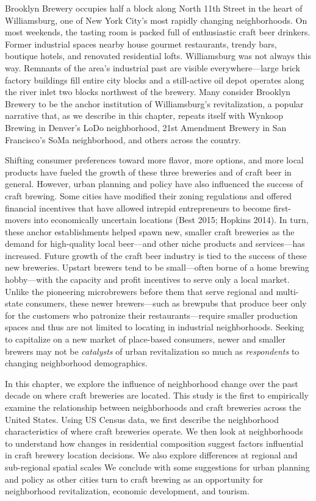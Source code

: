 \documentclass[]{article}
\begin{document}
Brooklyn Brewery occupies half a block along North 11th Street in the
heart of Williamsburg, one of New York City's most rapidly changing
neighborhoods. On most weekends, the tasting room is packed full of
enthusiastic craft beer drinkers. Former industrial spaces nearby house
gourmet restaurants, trendy bars, boutique hotels, and renovated
residential lofts. Williamsburg was not always this way. Remnants of the
area's industrial past are visible everywhere---large brick factory
buildings fill entire city blocks and a still-active oil depot operates
along the river inlet two blocks northwest of the brewery. Many consider
Brooklyn Brewery to be the anchor institution of Williamsburg's
revitalization, a popular narrative that, as we describe in this
chapter, repeats itself with Wynkoop Brewing in Denver's LoDo
neighborhood, 21st Amendment Brewery in San Francisco's SoMa
neighborhood, and others across the country.

Shifting consumer preferences toward more flavor, more options, and more
local products have fueled the growth of these three breweries and of
craft beer in general. However, urban planning and policy have also
influenced the success of craft brewing. Some cities have modified their
zoning regulations and offered financial incentives that have allowed
intrepid entrepreneurs to become first-movers into economically
uncertain locations (Best 2015; Hopkins 2014). In turn, these anchor
establishments helped spawn new, smaller craft breweries as the demand
for high-quality local beer---and other niche products and
services---has increased. Future growth of the craft beer industry is
tied to the success of these new breweries. Upstart brewers tend to be
small---often borne of a home brewing hobby---with the capacity and
profit incentives to serve only a local market. Unlike the pioneering
microbrewers before them that serve regional and multi-state consumers,
these newer brewers---such as brewpubs that produce beer only for the
customers who patronize their restaurants---require smaller production
spaces and thus are not limited to locating in industrial neighborhoods.
Seeking to capitalize on a new market of place-based consumers, newer
and smaller brewers may not be \emph{catalysts} of urban revitalization
so much as \emph{respondents} to changing neighborhood demographics.

In this chapter, we explore the influence of neighborhood change over
the past decade on where craft breweries are located. This study is the
first to empirically examine the relationship between neighborhoods and
craft breweries across the United States. Using US Census data, we first
describe the neighborhood characteristics of where craft breweries
operate. We then look at neighborhoods to understand how changes in
residential composition suggest factors influential in craft brewery
location decisions. We also explore differences at regional and
sub-regional spatial scales We conclude with some suggestions for urban
planning and policy as other cities turn to craft brewing as an
opportunity for neighborhood revitalization, economic development, and
tourism.
\end{document}
